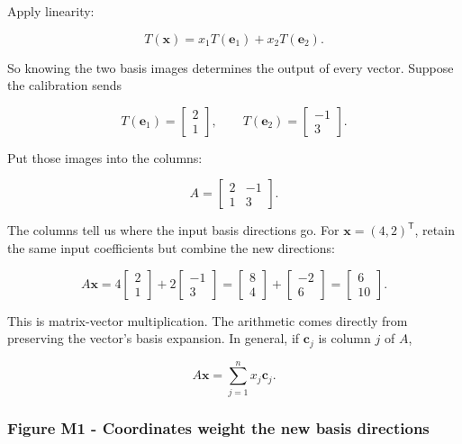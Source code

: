 Apply linearity:

\[
T(\mathbf x)=x_1T(\mathbf e_1)+x_2T(\mathbf e_2).
\]

So knowing the two basis images determines the output of every vector. Suppose the calibration sends

\[
T(\mathbf e_1)=\begin{bmatrix}2\\1\end{bmatrix},\qquad
T(\mathbf e_2)=\begin{bmatrix}-1\\3\end{bmatrix}.
\]

Put those images into the columns:

\[
A=\begin{bmatrix}2&-1\\1&3\end{bmatrix}.
\]

The columns tell us where the input basis directions go. For \(\mathbf x=(4,2)^{\mathsf T}\), retain the same input coefficients but combine the new directions:

\[
A\mathbf x
=4\begin{bmatrix}2\\1\end{bmatrix}
+2\begin{bmatrix}-1\\3\end{bmatrix}
=\begin{bmatrix}8\\4\end{bmatrix}+\begin{bmatrix}-2\\6\end{bmatrix}
=\begin{bmatrix}6\\10\end{bmatrix}.
\]

This is matrix-vector multiplication. The arithmetic comes directly from preserving the vector's basis expansion. In general, if \(\mathbf c_j\) is column \(j\) of \(A\),

\[
A\mathbf x=\sum_{j=1}^{n}x_j\mathbf c_j.
\]

\subsubsection{Figure M1 - Coordinates weight the new basis directions}\label{01-foundations-i-ch018-figure-m1---coordinates-weight-the-new-basis-directions}

